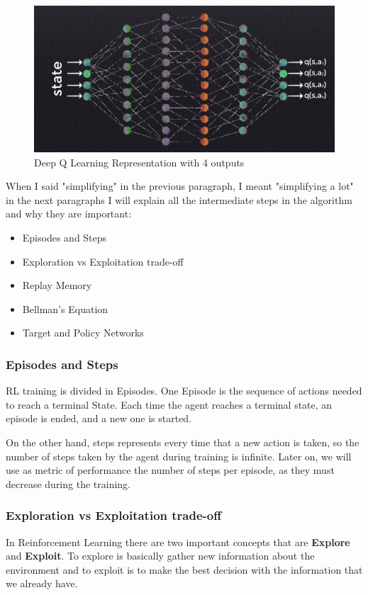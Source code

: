 		\begin{figure}[h]
			\centering
			\includegraphics[width=1\linewidth]{Images/DeepQ-Network.jpg}
			\caption[Deep Q Learning]{Deep Q Learning Representation with 4 outputs}
			\label{fig:deepqnetwork}
		\end{figure}
		
		When I said "simplifying" in the previous paragraph, I meant "simplifying a lot" in the next paragraphs I will explain all the intermediate steps in the algorithm and why they are important:
		
		\begin{itemize}
			\item[\textendash]Episodes and Steps
			\item[\textendash]Exploration vs Exploitation trade-off
			\item[\textendash]Replay Memory
			\item[\textendash]Bellman's Equation
			\item[\textendash]Target and Policy Networks
		\end{itemize}
	
		\subsubsection{Episodes and Steps}
			RL training is divided in Episodes. One Episode is the sequence of actions needed to reach a terminal State. Each time the agent reaches a terminal state, an episode is ended, and a new one is started.
			
			On the other hand, steps represents every time that a new action is taken, so the number of steps taken by the agent during training is infinite. Later on, we will use as metric of performance the number of steps per episode, as they must decrease during the training.
		
		\subsubsection{Exploration vs Exploitation trade-off}
			In Reinforcement Learning there are two important concepts that are \textbf{Explore} and \textbf{Exploit}. To explore is basically gather new information about the environment and to exploit is to make the best decision with the information that we already have.
			
